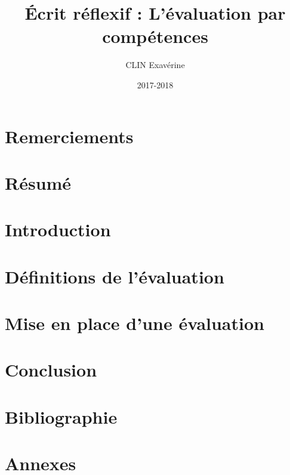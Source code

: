 \documentclass[a4paper, 12pt]{article}
\title{Écrit réflexif : L'évaluation par compétences}
\author{CLIN Exavérine}
\date{2017-2018}
\begin{document}
\maketitle

\newpage
\part*{Remerciements}


\newpage
\part*{Résumé}



\newpage
\tableofcontents

\newpage
\part{Introduction}


\newpage
\part{Définitions de l'évaluation}

\setcounter{section}{0}

\newpage
\part{Mise en place d'une évaluation}

\setcounter{section}{0}

%

\newpage
\part{Conclusion}


\newpage
\part*{Bibliographie}


\newpage
\part*{Annexes}
\end{document}
